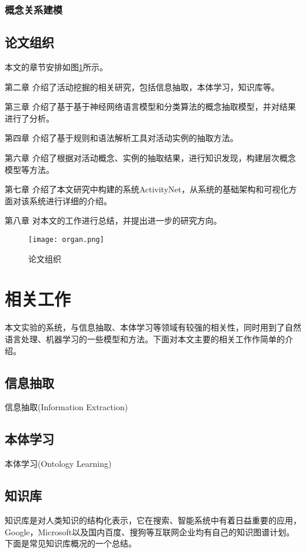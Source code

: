 \subsection{概念关系建模}

\section{论文组织}
本文的章节安排如图\ref{fig:organ}所示。

{\heiti 第二章} 介绍了活动挖掘的相关研究，包括信息抽取，本体学习，知识库等。

{\heiti 第三章} 介绍了基于基于神经网络语言模型和分类算法的概念抽取模型，并对结果进行了分析。

{\heiti 第四章} 介绍了基于规则和语法解析工具对活动实例的抽取方法。

{\heiti 第六章} 介绍了根据对活动概念、实例的抽取结果，进行知识发现，构建层次概念模型等方法。

{\heiti 第七章} 介绍了本文研究中构建的系统ActivityNet，从系统的基础架构和可视化方面对该系统进行详细的介绍。

{\heiti 第八章} 对本文的工作进行总结，并提出进一步的研究方向。

\begin{figure}[!h]
\caption{论文组织}
\label{fig:organ}
\begin{center}
\texttt{[image: organ.png]}
\end{center}
\end{figure}

\chapter{相关工作}
本文实验的系统，与信息抽取、本体学习等领域有较强的相关性，同时用到了自然语言处理、机器学习的一些模型和方法。下面对本文主要的相关工作作简单的介绍。
\section{信息抽取}
信息抽取(Information Extraction)
\section{本体学习}
本体学习(Ontology Learning)

\section{知识库}
知识库是对人类知识的结构化表示，它在搜索、智能系统中有着日益重要的应用，Google，Microsoft以及国内百度、搜狗等互联网企业均有自己的知识图谱计划。下面是常见知识库概况的一个总结。


